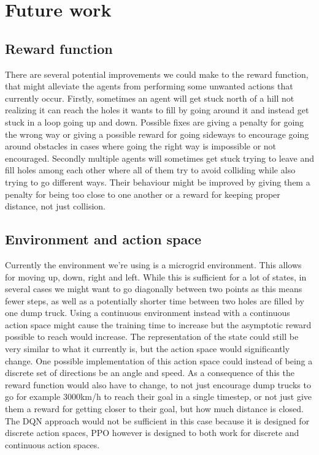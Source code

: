 \documentclass[conference]{IEEEtran}
\begin{document}
	\section{Future work}

	\subsection{Reward function}
	There are several potential improvements we could make to the reward function, that might alleviate the agents from performing some unwanted actions that currently occur.
	Firstly, sometimes an agent will get stuck north of a hill not realizing it can reach the holes it wants to fill by going around it and instead get stuck in a loop going up and down.
	Possible fixes are giving a penalty for going the wrong way or giving a possible reward for going sideways to encourage going around obstacles in cases where going the right way is impossible or not encouraged.
	Secondly multiple agents will sometimes get stuck trying to leave and fill holes among each other where all of them try to avoid colliding while also trying to go different ways.
	Their behaviour might be improved by giving them a penalty for being too close to one another or a reward for keeping proper distance, not just collision.

	\subsection{Environment and action space}
	Currently the environment we're using is a microgrid environment. This allows for moving up, down, right and left.
	While this is sufficient for a lot of states, in several cases we might want to go diagonally between two points as this means fewer steps, as well as a potentially shorter time between two holes are filled by one dump truck.
	Using a continuous environment instead with a continuous action space might cause the training time to increase but the asymptotic reward possible to reach would increase. The representation of the state could still be very similar to what it currently is, but the action space would significantly change.
	One possible implementation of this action space could instead of being a discrete set of directions be an angle and speed.
	As a consequence of this the reward function would also have to change, to not just encourage dump trucks to go for example 3000km/h to reach their goal in a single timestep, or not just give them a reward for getting closer to their goal, but how much distance is closed.
	The DQN approach would not be sufficient in this case because it is designed for discrete action spaces, PPO however is designed to both work for discrete and continuous action spaces.
\end{document}
